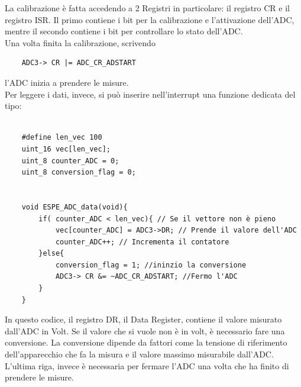 La calibrazione è fatta accedendo a 2 Registri in particolare: il registro CR e il registro ISR. Il primo contiene i bit per la calibrazione e l'attivazione dell'ADC, mentre il secondo contiene i bit per controllare lo stato dell'ADC.\\

Una volta finita la calibrazione,  scrivendo
\noindent

\begin{verbatim}
    ADC3-> CR |= ADC_CR_ADSTART
\end{verbatim}
l'ADC inizia a prendere le misure.\\
Per leggere i dati, invece, si può inserire nell'interrupt una funzione dedicata del tipo:

\noindent
\begin{verbatim}

    #define len_vec 100
    uint_16 vec[len_vec];
    uint_8 counter_ADC = 0;
    uint_8 conversion_flag = 0;

    
    void ESPE_ADC_data(void){
        if( counter_ADC < len_vec){ // Se il vettore non è pieno
            vec[counter_ADC] = ADC3->DR; // Prende il valore dell'ADC
            counter_ADC++; // Incrementa il contatore
        }else{
            conversion_flag = 1; //ininzio la conversione
            ADC3-> CR &= ~ADC_CR_ADSTART; //Fermo l'ADC
        }
    }

\end{verbatim}
\label{code:ADC_data}

In questo codice, il registro DR, il Data Register, contiene il valore misurato dall'ADC in Volt. Se il valore che si vuole non è in volt, è necessario fare una conversione. La conversione dipende da fattori come la tensione di riferimento dell'apparecchio che fa la misura e il valore massimo misurabile dall'ADC.\\

L'ultima riga, invece è necessaria per fermare l'ADC una volta che ha finito di prendere le misure.\\